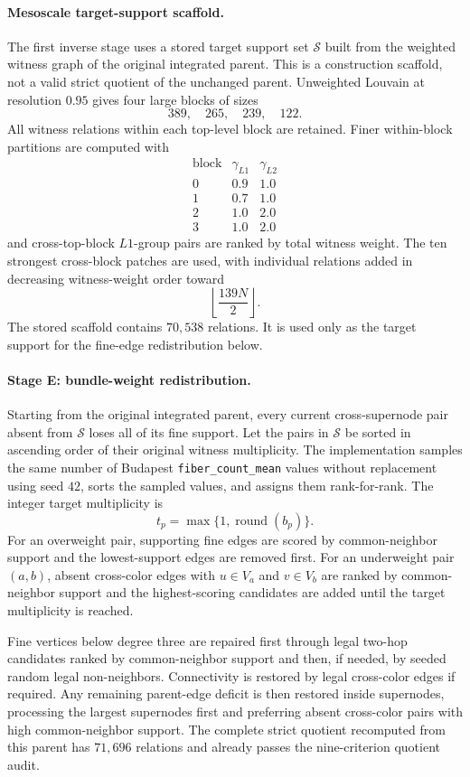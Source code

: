\documentclass[12pt]{article}
\begin{document}
\paragraph{Mesoscale target-support scaffold.}
The first inverse stage uses a stored target support set \(\mathcal S\) built
from the weighted witness graph of the original integrated parent.  This is a
construction scaffold, not a valid strict quotient of the unchanged parent.
Unweighted Louvain at resolution \(0.95\) gives four large blocks of sizes
\[
389,\quad265,\quad239,\quad122.
\]
All witness relations within each top-level block are retained.  Finer
within-block partitions are computed with
\[
\begin{array}{c|cc}
\text{block}&\gamma_{L1}&\gamma_{L2}\\
\hline
0&0.9&1.0\\
1&0.7&1.0\\
2&1.0&2.0\\
3&1.0&2.0
\end{array}
\]
and cross-top-block \(L1\)-group pairs are ranked by total witness weight.
The ten strongest cross-block patches are used, with individual relations
added in decreasing witness-weight order toward
\[
\left\lfloor\frac{139N}{2}\right\rfloor.
\]
The stored scaffold contains \(70{,}538\) relations.  It is used only as the
target support for the fine-edge redistribution below.

\paragraph{Stage E: bundle-weight redistribution.}
Starting from the original integrated parent, every current cross-supernode
pair absent from \(\mathcal S\) loses all of its fine support.  Let the pairs
in \(\mathcal S\) be sorted in ascending order of their original witness
multiplicity.  The implementation samples the same number of Budapest
\texttt{fiber\_count\_mean} values without replacement using seed \(42\),
sorts the sampled values, and assigns them rank-for-rank.  The integer target
multiplicity is
\[
t_p=\max\{1,\operatorname{round}(b_p)\}.
\]
For an overweight pair, supporting fine edges are scored by common-neighbor
support and the lowest-support edges are removed first.  For an underweight
pair \((a,b)\), absent cross-color edges with \(u\in V_a\) and \(v\in V_b\)
are ranked by common-neighbor support and the highest-scoring candidates are
added until the target multiplicity is reached.

Fine vertices below degree three are repaired first through legal two-hop
candidates ranked by common-neighbor support and then, if needed, by seeded
random legal non-neighbors.  Connectivity is restored by legal cross-color
edges if required.  Any remaining parent-edge deficit is then restored
inside supernodes, processing the largest supernodes first and preferring
absent cross-color pairs with high common-neighbor support.  The complete
strict quotient recomputed from this parent has \(71{,}696\) relations and
already passes the nine-criterion quotient audit.
\end{document}
